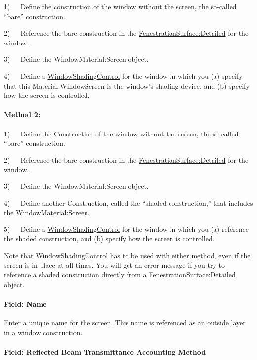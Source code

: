 1)~~~Define the construction of the window without the screen, the so-called ``bare'' construction.

2)~~~Reference the bare construction in the \hyperref[fenestrationsurfacedetailed]{FenestrationSurface:Detailed} for the window.

3)~~~Define the WindowMaterial:Screen object.

4)~~~Define a \hyperref[windowpropertyshadingcontrol]{WindowShadingControl} for the window in which you (a) specify that this Material:WindowScreen is the window's shading device, and (b) specify how the screen is controlled.

\paragraph{Method 2:}\label{method-2-2}

1)~~~Define the Construction of the window without the screen, the so-called ``bare'' construction.

2)~~~Reference the bare construction in the \hyperref[fenestrationsurfacedetailed]{FenestrationSurface:Detailed} for the window.

3)~~~Define the WindowMaterial:Screen object.

4)~~~Define another Construction, called the ``shaded construction,'' that includes the WindowMaterial:Screen.

5)~~~Define a \hyperref[windowpropertyshadingcontrol]{WindowShadingControl} for the window in which you (a) reference the shaded construction, and (b) specify how the screen is controlled.

Note that \hyperref[windowpropertyshadingcontrol]{WindowShadingControl} has to be used with either method, even if the screen is in place at all times. You will get an error message if you try to reference a shaded construction directly from a \hyperref[fenestrationsurfacedetailed]{FenestrationSurface:Detailed} object.

\paragraph{Field: Name}\label{field-name-19-004}

Enter a unique name for the screen. This name is referenced as an outside layer in a window construction.

\paragraph{Field: Reflected Beam Transmittance Accounting Method}\label{field-reflected-beam-transmittance-accounting-method}

